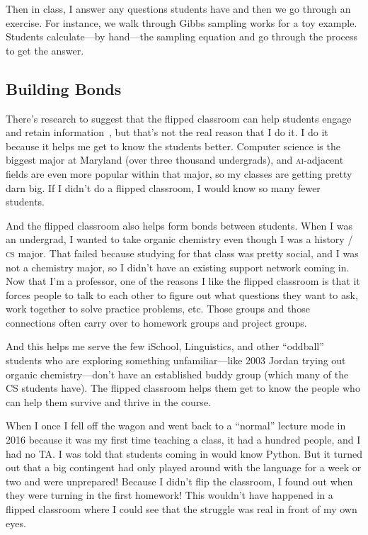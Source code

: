 \documentclass[11pt]{amsart}
\newcommand{\abr}[1]{\textsc{#1}}
\begin{document}
Then in class, I answer any questions students have and then we go
through an exercise.
%
For instance, we walk through Gibbs sampling
works for a toy example.
%
Students calculate---by hand---the sampling
equation and go through the process to get the answer.

%

\subsection{Building Bonds}

There's research to suggest that the flipped classroom can help
students engage and retain information~\cite{Zuber-16}, but that's not
the real reason that I do it.
%
I do it because it helps me get to know the students better.  Computer
science is the biggest major at Maryland (over three thousand undergrads), and
\abr{ai}-adjacent fields are even more popular within that major, so my
classes are getting pretty darn big.
%
If I didn't do a flipped
classroom, I would know so many fewer students.

And the flipped classroom also helps form bonds between students.
%
When I was an undergrad, I wanted to take organic chemistry even
though I was a history / \abr{cs} major.
%
That failed because studying for
that class was pretty social, and I was not a chemistry major, so I
didn't have an existing support network coming in.
%
Now that I'm a
professor, one of the reasons I like the flipped classroom is that it
forces people to talk to each other to figure out what questions they
want to ask, work together to solve practice problems, etc.
%
Those
groups and those connections often carry over to homework groups and
project groups.

And this helps me serve the few iSchool, Linguistics, and other ``oddball''
students who are exploring something unfamiliar---like 2003 Jordan trying out
organic chemistry---don't have an established buddy group (which many of the
CS students have).  The flipped classroom helps them get to know the people
who can help them survive and thrive in the course.

When I once I fell off the wagon and went back to a ``normal'' lecture
mode in 2016 because it was my first time teaching a class, it had a
hundred people, and I had no TA.  I was told that students coming in
would know Python.  But it turned out that a big contingent had only
played around with the language for a week or two and were unprepared!
Because I didn't flip the classroom, I found out when they were turning in the first homework! This wouldn't have happened in a flipped classroom where
I could see that the struggle was real in front of my own eyes.
\end{document}

